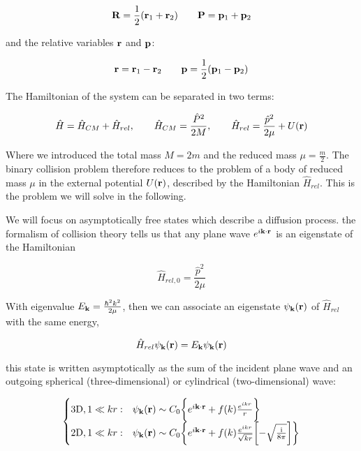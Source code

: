 \begin{equation}
    \vb{R} = \frac{1}{2}(\vb{r}_1 + \vb{r}_2) \quad \quad \vb{P} = \vb{p}_1 + \vb{p}_2
\end{equation}

and the relative variables $\vb{r}$ and $\vb{p}$:

\begin{equation}
    \vb{r} = \vb{r}_1 - \vb{r}_2 \quad \quad \vb{p} = \frac{1}{2}(\vb{p}_1 - \vb{p}_2)
\end{equation}

The Hamiltonian of the system can be separated in two terms:

\begin{equation}
    \hat{H} = \hat{H}_{CM}+\hat{H}_{rel}, \quad \quad \hat{H}_{CM} = \frac{\hat{P}^2}{2M}, \quad \quad \hat{H}_{rel} = \frac{\hat{p}^2}{2\mu} + U(\vb{r})
\end{equation}

Where we introduced the total mass $M=2m$ and the reduced mass $\mu = \frac{m}{2}$. The binary collision problem therefore reduces to the problem of a body of reduced mass $\mu$ in the external potential $U(\vb{r})$, described by the Hamiltonian $\hat{H}_{rel}$. This is the problem we will solve in the following.

We will focus on asymptotically free states which describe a diffusion process. the formalism of collision theory tells us that any plane wave $e^{i\vb k\cdot \vb r}$ is an eigenstate of the Hamiltonian

\begin{equation}
    \hat{H}_{rel,0} = \frac{\hat{p}^2}{2\mu}
\end{equation}

With eigenvalue $E_{\vb{k}}=\frac{\hbar^2 k^2}{2\mu}$, then we can associate an eigenstate $\psi_{\vb k}(\vb r)$ of $\hat{H}_{rel}$ with the same energy,

\begin{equation}
    \hat{H}_{rel}\psi_{\vb k}(\vb r) = E_{\vb k}\psi_{\vb k}(\vb r)
\end{equation}

this state is written asymptotically as the sum of the incident plane wave and an outgoing spherical (three-dimensional) or cylindrical (two-dimensional) wave:

\begin{equation}\label{eq:asymptotic_state}
    \begin{cases}
        \text{3D},1\ll kr: & \psi_{\vb k}(\vb r) \sim C_0\biggl \{e^{i\vb k\cdot \vb r} + f(k)\frac{e^{ikr}}{r}\biggr \} \\
        \text{2D},1\ll kr  : & \psi_{\vb k}(\vb r) \sim C_0\biggl \{e^{i\vb k\cdot \vb r} + f(k)\frac{e^{ikr}}{\sqrt{kr}}\biggl [ -\sqrt{\frac{\text{i}}{8\pi}}\biggr ]\biggr \}
    \end{cases}
\end{equation}

